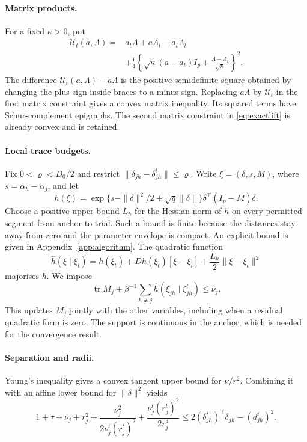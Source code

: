 \documentclass[12pt,a4paper]{article}
\theoremstyle{remark}
\DeclareMathOperator{\tr}{tr}
\begin{document}
\paragraph{Matrix products.}
For a fixed $\kappa>0$, put
\begin{equation}\label{eq:matrixmajorant}
\begin{aligned}
 \mathcal U_t(a,\Lambda)
 ={}&a_t\Lambda+a\Lambda_t-a_t\Lambda_t\\
 &+\frac14\left\{\sqrt\kappa(a-a_t)I_p+
                 \frac{\Lambda-\Lambda_t}{\sqrt\kappa}\right\}^2.
\end{aligned}
\end{equation}
The difference $\mathcal U_t(a,\Lambda)-a\Lambda$ is the positive semidefinite square obtained by changing the plus sign inside braces to a minus sign. Replacing $a\Lambda$ by $\mathcal U_t$ in the first matrix constraint gives a convex matrix inequality. Its squared terms have Schur-complement epigraphs. The second matrix constraint in \eqref{eq:exactlift} is already convex and is retained.

\paragraph{Local trace budgets.}
Fix $0<\varrho<D_0/2$ and restrict $\|\delta_{jh}-\delta_{jh}^t\|\le\varrho$. Write $\xi=(\delta,s,M)$, where $s=\alpha_h-\alpha_j$, and let
\begin{equation}\label{eq:h}
 h(\xi)=\exp\{s-\|\delta\|^2/2+\sqrt q\|\delta\|\}
               \delta^\top(I_p-M)\delta.
\end{equation}
Choose a positive upper bound $L_h$ for the Hessian norm of $h$ on every permitted segment from anchor to trial. Such a bound is finite because the distances stay away from zero and the parameter envelope is compact. An explicit bound is given in Appendix~\ref{app:algorithm}. The quadratic function
\begin{equation}\label{eq:hhat}
 \widehat h(\xi\mid\xi_t)
 =h(\xi_t)+Dh(\xi_t)[\xi-\xi_t]
             +\frac{L_h}{2}\|\xi-\xi_t\|^2
\end{equation}
majorises $h$. We impose
\[
 \tr M_j+\beta^{-1}\sum_{h\ne j}
       \widehat h(\xi_{jh}\mid\xi_{jh}^t)\le\nu_j.
\]
This updates $M_j$ jointly with the other variables, including when a residual quadratic form is zero. The support is continuous in the anchor, which is needed for the convergence result.

\paragraph{Separation and radii.}
Young's inequality gives a convex tangent upper bound for $\nu/r^2$. Combining it with an affine lower bound for $\|\delta\|^2$ yields
\begin{equation}\label{eq:innersep}
 1+\tau+\nu_j+r_j^2+
 \frac{\nu_j^2}{2\nu_j^t(r_j^t)^2}
 +\frac{\nu_j^t(r_j^t)^2}{2r_j^4}
 \le2(\delta_{jh}^t)^\top\delta_{jh}-(d_{jh}^t)^2.
\end{equation}
\end{document}

